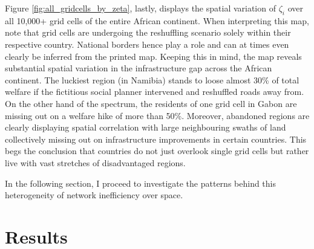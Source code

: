 \documentclass[11pt, oneside]{article}   	%
\begin{document}
Figure \eqref{fig:all_gridcells_by_zeta}, lastly, displays the spatial variation of $\zeta_{i}$ over all 10,000+ grid cells of the entire African continent. When interpreting this map, note that grid cells are undergoing the reshuffling scenario solely within their respective country. National borders hence play a role and can at times even clearly be inferred from the printed map. Keeping this in mind, the map reveals substantial spatial variation in the infrastructure gap across the African continent. The luckiest region (in Namibia) stands to loose almost 30\% of total welfare if the fictitious social planner intervened and reshuffled roads away from. On the other hand of the spectrum, the residents of one grid cell in Gabon are missing out on a welfare hike of more than 50\%. Moreover, abandoned regions are clearly displaying spatial correlation with large neighbouring swaths of land collectively missing out on infrastructure improvements in certain countries. This begs the conclusion that countries do not just overlook single grid cells but rather live with vast stretches of disadvantaged regions.

In the following section, I proceed to investigate the patterns behind this heterogeneity of network inefficiency over space.

\section{Results}
\end{document}
